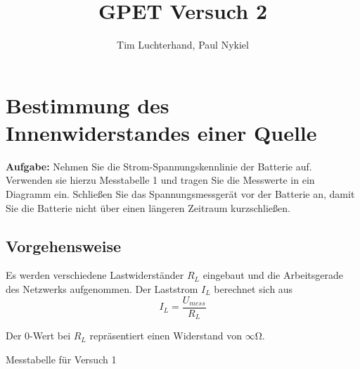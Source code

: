 \documentclass[10pt]{report}
\author{Tim Luchterhand, Paul Nykiel}
\title{GPET Versuch 2}
\begin{document}
        \maketitle

        \section{Bestimmung des Innenwiderstandes einer Quelle}
        \textbf{Aufgabe:} Nehmen Sie die Strom-Spannungskennlinie der Batterie auf. Verwenden sie hierzu Messtabelle
        1 und tragen Sie die Messwerte in ein Diagramm ein. Schließen Sie das Spannungsmessgerät
        vor der Batterie an, damit Sie die Batterie nicht über einen längeren
        Zeitraum kurzschließen.

        \subsection{Vorgehensweise}
        Es werden verschiedene Lastwiderständer $R_L$ eingebaut und die Arbeitsgerade
        des Netzwerks aufgenommen. Der Laststrom $I_L$ berechnet sich aus
        \begin{equation*}
            I_L = \frac{U_{mess}}{R_L}
        \end{equation*}


        \vspace{0.5cm}

        Der $0$-Wert bei $R_L$ repräsentiert einen Widerstand von $\infty \si{\ohm}$.
        \begin{table}[H]
            \begin{center}
                \caption{Messtabelle für Versuch 1}
                \label{tablec}
            \end{center}
        \end{table}
\end{document}
